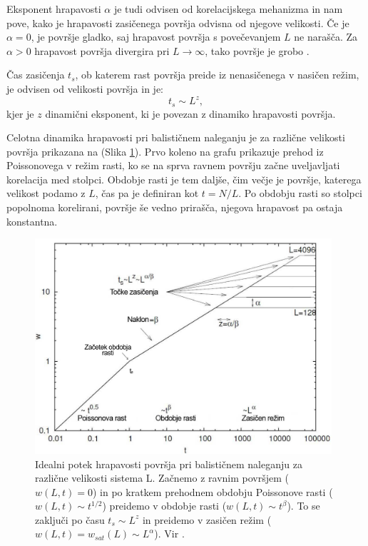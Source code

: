 \documentclass[a4paper, twoside, 12pt]{book}
\begin{document}
Eksponent hrapavosti $\alpha$ je tudi odvisen od korelacijskega mehanizma in nam pove, kako je hrapavosti zasičenega površja odvisna od njegove velikosti. Če je $\alpha = 0$, je površje gladko, saj hrapavost površja s povečevanjem $L$ ne narašča. Za $\alpha > 0$ hrapavost površja divergira pri $L \rightarrow \infty$, tako površje je grobo \cite{krim1993roughness}.

Čas zasičenja $t_s$, ob katerem rast površja preide iz nenasičenega v nasičen režim, je odvisen od velikosti površja in je:
  \begin{equation}
    t_s \sim L^z,
    \label{z}
  \end{equation}
kjer je $z$ dinamični eksponent, ki je povezan z dinamiko hrapavosti površja.

Celotna dinamika hrapavosti pri balističnem naleganju je za različne velikosti površja prikazana na (Slika \ref{fig:barabasi}). Prvo koleno na grafu prikazuje prehod iz Poissonovega v režim rasti, ko se na sprva ravnem površju začne uveljavljati korelacija med stolpci. Obdobje rasti je tem daljše, čim večje je površje, katerega velikost podamo z $L$, čas pa je definiran kot $t=N/L$. Po obdobju rasti so stolpci popolnoma korelirani, površje še vedno prirašča, njegova hrapavost pa ostaja konstantna.

    \begin{figure}[h]
      \begin{center}
        \includegraphics[width=11cm]{slike/bdep3.pdf}
      \end{center}
      \caption{Idealni potek hrapavosti površja pri balističnem naleganju za različne velikosti sistema L. Začnemo z ravnim površjem ($w(L,t)=0$) in po kratkem prehodnem obdobju Poissonove rasti ($w(L,t) \sim t^{1/2}$) preidemo v obdobje rasti ($w(L,t) \sim t^{\beta}$). To se zaključi po času $t_s \sim L^z$ in preidemo v zasičen režim ($w(L,t) = w_{sat}(L) \sim L^{\alpha}$). Vir \cite{schwettmann2003}.}
      \label{fig:barabasi}
    \end{figure}
\end{document}
